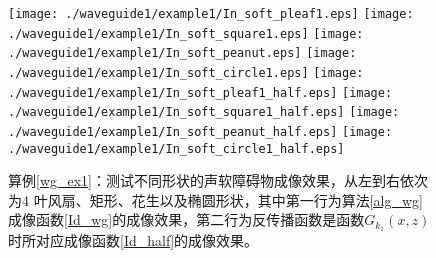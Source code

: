 \begin{figure}[h]
  \centering
  \texttt{[image: ./waveguide1/example1/In\_soft\_pleaf1.eps]}
  \texttt{[image: ./waveguide1/example1/In\_soft\_square1.eps]}
  \texttt{[image: ./waveguide1/example1/In\_soft\_peanut.eps]}
  \texttt{[image: ./waveguide1/example1/In\_soft\_circle1.eps]}
  \texttt{[image: ./waveguide1/example1/In\_soft\_pleaf1\_half.eps]}
  \texttt{[image: ./waveguide1/example1/In\_soft\_square1\_half.eps]}
  \texttt{[image: ./waveguide1/example1/In\_soft\_peanut\_half.eps]}
  \texttt{[image: ./waveguide1/example1/In\_soft\_circle1\_half.eps]}
  \caption{算例\ref{wg_ex1}：测试不同形状的声软障碍物成像效果，从左到右依次为4 叶风扇、矩形、花生以及椭圆形状，其中第一行为算法\ref{alg_wg}成像函数\ref{Id_wg}的成像效果，第二行为反传播函数是函数$G_{k_1}(x,z)$时所对应成像函数\ref{Id_half}的成像效果。}\label{fig_wg_ex1}
\end{figure}

